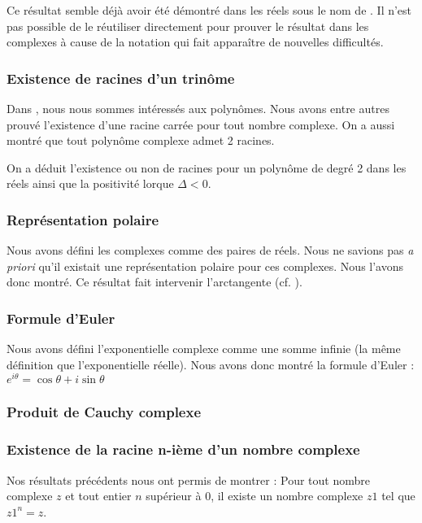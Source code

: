 Ce résultat semble déjà avoir été démontré dans les réels sous le nom de . Il n'est pas possible de le réutiliser directement pour prouver le résultat dans les complexes à cause de la notation  qui fait apparaître de nouvelles difficultés.

\subsubsection{Existence de racines d'un trinôme}

Dans , nous nous sommes intéressés aux polynômes. Nous avons entre autres prouvé l'existence d'une racine carrée pour tout nombre complexe. On a aussi montré que tout polynôme complexe admet 2 racines.

On a déduit l'existence ou non de racines pour un polynôme de degré 2 dans les réels ainsi que la positivité lorque $\Delta < 0$.

\subsubsection{Représentation polaire}

Nous avons défini les complexes comme des paires de réels. Nous ne savions pas \emph{a priori} qu'il existait une représentation polaire pour ces complexes. Nous l'avons donc montré. Ce résultat fait intervenir l'arctangente (cf. ).

\subsubsection{Formule d'Euler}

Nous avons défini l'exponentielle complexe comme une somme infinie (la même définition que l'exponentielle réelle). Nous avons donc montré la formule d'Euler : $ e^{ i\theta } = \cos \theta + i\sin \theta $

\subsubsection{Produit de Cauchy complexe}%

\subsubsection{Existence de la racine n-ième d'un nombre complexe}
Nos résultats précédents nous ont permis de montrer :
Pour tout nombre complexe $z$ et tout entier $n$ supérieur à $0$, il existe un nombre complexe $z1$ tel que $z1 ^ n = z$.

